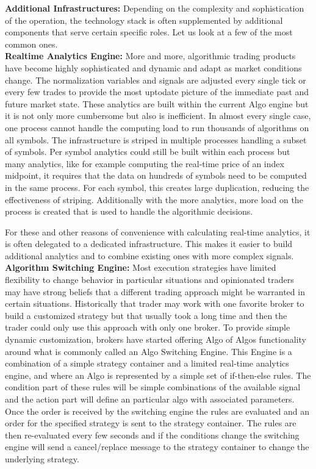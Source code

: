 \noindent\textbf{Additional Infrastructures:} Depending on the complexity and sophistication of the operation, the technology stack is often supplemented by additional components that serve certain specific roles. Let us look at a few of the most common ones. \\


\noindent\textbf{Realtime Analytics Engine:} More and more, algorithmic trading products have become highly sophisticated and dynamic and adapt as market conditions change. The normalization variables and signals are adjusted every single tick or every few trades to provide the most uptodate picture of the immediate past and future market state. These analytics are built within the current Algo engine but it is not only more cumbersome but also is inefficient. In almost every single case, one process cannot handle the computing load to run thousands of algorithms on all symbols. The infrastructure is striped in multiple processes handling a subset of symbols. Per symbol analytics could still be built within each process but many analytics, like for example computing the real-time price of an index midpoint, it requires that the data on hundreds of symbols need to be computed in the same process. For each symbol, this creates large duplication, reducing the effectiveness of striping. Additionally with the more analytics, more load on the process is created that is used to handle the algorithmic decisions.


For these and other reasons of convenience with calculating real-time analytics, it is often delegated to a dedicated infrastructure. This makes it easier to build additional analytics and to combine existing ones with more complex signals. \\


\noindent\textbf{Algorithm Switching Engine:} Most execution strategies have limited flexibility to change behavior in particular situations and opinionated traders may have strong beliefs that a different trading approach might be warranted in certain situations. Historically that trader may work with one favorite broker to build a customized strategy but that usually took a long time and then the trader could only use this approach with only one broker. To provide simple dynamic customization, brokers have started offering Algo of Algos functionality around what is commonly called an Algo Switching Engine. This Engine is a combination of a simple strategy container and a limited real-time analytics engine, and where an Algo is represented by a simple set of if-then-else rules. The condition  part of these rules will be simple combinations of the available signal and the action part will define an particular algo with associated parameters. Once the order is received by the switching engine the rules are evaluated and an order for the specified strategy is sent to the strategy container. The rules are then re-evaluated every few seconds and if the conditions change the switching engine will send a cancel/replace message to the strategy container to change the underlying strategy. 


